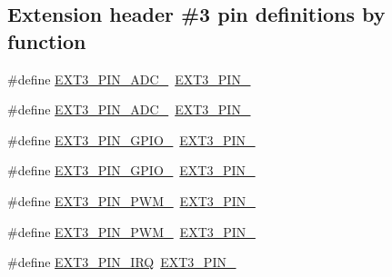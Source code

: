 \subsection*{Extension header \#3 pin definitions by function}
\begin{DoxyCompactItemize}
\item 
\#define \mbox{\hyperlink{group__samd21__xplained__pro__features__group_gab613ff1e93459a7159a42fa50a352281}{E\+X\+T3\+\_\+\+P\+I\+N\+\_\+\+A\+D\+C\+\_}}~\mbox{\hyperlink{group__samd21__xplained__pro__features__group_ga8e823d76e968e9463aa7ed9d681ab4c5}{E\+X\+T3\+\_\+\+P\+I\+N\+\_}}
\item 
\#define \mbox{\hyperlink{group__samd21__xplained__pro__features__group_ga37d0af5deaabdad4c7e2be4a2fad81a4}{E\+X\+T3\+\_\+\+P\+I\+N\+\_\+\+A\+D\+C\+\_}}~\mbox{\hyperlink{group__samd21__xplained__pro__features__group_ga2659ebbdbb6a69bacfb06d0c5e076686}{E\+X\+T3\+\_\+\+P\+I\+N\+\_}}
\item 
\#define \mbox{\hyperlink{group__samd21__xplained__pro__features__group_ga0fcf49640ad0c8cdb543b616f5202c11}{E\+X\+T3\+\_\+\+P\+I\+N\+\_\+\+G\+P\+I\+O\+\_}}~\mbox{\hyperlink{group__samd21__xplained__pro__features__group_gae0e882567ba8d8b65d6f02ce1c8e197b}{E\+X\+T3\+\_\+\+P\+I\+N\+\_}}
\item 
\#define \mbox{\hyperlink{group__samd21__xplained__pro__features__group_gaf1491d9740447373c693ce7fe36fb8c1}{E\+X\+T3\+\_\+\+P\+I\+N\+\_\+\+G\+P\+I\+O\+\_}}~\mbox{\hyperlink{group__samd21__xplained__pro__features__group_gae585af12e54a482a9c0b560088f49961}{E\+X\+T3\+\_\+\+P\+I\+N\+\_}}
\item 
\#define \mbox{\hyperlink{group__samd21__xplained__pro__features__group_ga38bee8d1c9027e2005cce205817e230d}{E\+X\+T3\+\_\+\+P\+I\+N\+\_\+\+P\+W\+M\+\_}}~\mbox{\hyperlink{group__samd21__xplained__pro__features__group_ga9da5b6d042c1319ae248f3edc093cd82}{E\+X\+T3\+\_\+\+P\+I\+N\+\_}}
\item 
\#define \mbox{\hyperlink{group__samd21__xplained__pro__features__group_ga33687da9c2c7a58f75d902ca9333ab17}{E\+X\+T3\+\_\+\+P\+I\+N\+\_\+\+P\+W\+M\+\_}}~\mbox{\hyperlink{group__samd21__xplained__pro__features__group_gac33c7a96afb4b0a7be81fd0a4a3eb353}{E\+X\+T3\+\_\+\+P\+I\+N\+\_}}
\item 
\#define \mbox{\hyperlink{group__samd21__xplained__pro__features__group_gae5a41442bb3e9715c25f4cdc2d74f75a}{E\+X\+T3\+\_\+\+P\+I\+N\+\_\+\+I\+RQ}}~\mbox{\hyperlink{group__samd21__xplained__pro__features__group_ga4d3e99570736508ef7b8160dd9147959}{E\+X\+T3\+\_\+\+P\+I\+N\+\_}}

\end{DoxyCompactItemize}

